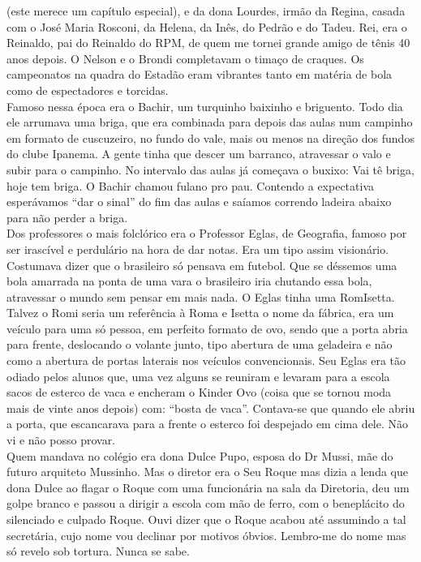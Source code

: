 \documentclass[12pt,brazil,]{book}
\begin{document}
(este merece um capítulo especial), e da dona Lourdes, irmão da Regina,
casada com o José Maria Rosconi, da Helena, da Inês, do Pedrão e do
Tadeu. Rei, era o Reinaldo, pai do Reinaldo do RPM, de quem me tornei
grande amigo de tênis 40 anos depois. O Nelson e o Brondi completavam o
timaço de craques. Os campeonatos na quadra do Estadão eram vibrantes
tanto em matéria de bola como de espectadores e torcidas.\\
Famoso nessa época era o Bachir, um turquinho baixinho e briguento. Todo
dia ele arrumava uma briga, que era combinada para depois das aulas num
campinho em formato de cuscuzeiro, no fundo do vale, mais ou menos na
direção dos fundos do clube Ipanema. A gente tinha que descer um
barranco, atravessar o valo e subir para o campinho. No intervalo das
aulas já começava o buxixo: Vai tê briga, hoje tem briga. O Bachir
chamou fulano pro pau. Contendo a expectativa esperávamos ``dar o
sinal'' do fim das aulas e saíamos correndo ladeira abaixo para não
perder a briga.\\
Dos professores o mais folclórico era o Professor Eglas, de Geografia,
famoso por ser irascível e perdulário na hora de dar notas. Era um tipo
assim visionário. Costumava dizer que o brasileiro só pensava em
futebol. Que se déssemos uma bola amarrada na ponta de uma vara o
brasileiro iria chutando essa bola, atravessar o mundo sem pensar em
mais nada. O Eglas tinha uma RomIsetta. Talvez o Romi seria um
referência à Roma e Isetta o nome da fábrica, era um veículo para uma só
pessoa, em perfeito formato de ovo, sendo que a porta abria para frente,
deslocando o volante junto, tipo abertura de uma geladeira e não como a
abertura de portas laterais nos veículos convencionais. Seu Eglas era
tão odiado pelos alunos que, uma vez alguns se reuniram e levaram para a
escola sacos de esterco de vaca e encheram o Kinder Ovo (coisa que se
tornou moda mais de vinte anos depois) com: ``bosta de vaca''.
Contava-se que quando ele abriu a porta, que escancarava para a frente o
esterco foi despejado em cima dele. Não vi e não posso provar.\\
Quem mandava no colégio era dona Dulce Pupo, esposa do Dr Mussi, mãe do
futuro arquiteto Mussinho. Mas o diretor era o Seu Roque mas dizia a
lenda que dona Dulce ao flagar o Roque com uma funcionária na sala da
Diretoria, deu um golpe branco e passou a dirigir a escola com mão de
ferro, com o beneplácito do silenciado e culpado Roque. Ouvi dizer que o
Roque acabou até assumindo a tal secretária, cujo nome vou declinar por
motivos óbvios. Lembro-me do nome mas só revelo sob tortura. Nunca se
sabe.
\end{document}
